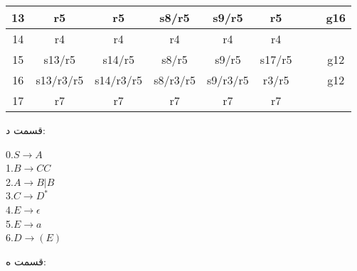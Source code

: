 \begin{center}
\begin{latin}
\begin{tabular}{|c|c|c|c|c|c|c|c|c|}
    13     &r5        &r5        &s8/r5     &s9/r5     &r5        &           &          &g16\\ \hline
    14     &r4        &r4        &r4        &r4        &r4        &           &          &   \\ \hline
    15     &s13/r5    &s14/r5    &s8/r5     &s9/r5     &s17/r5    &           &          &g12\\ \hline
    16     &s13/r3/r5 &s14/r3/r5 &s8/r3/r5  &s9/r3/r5  &r3/r5     &           &          &g12\\ \hline
    17     &r7        &r7        &r7        &r7        &r7        &           &          &   \\ \hline
    \end{tabular}
    \end{latin}
\end{center}

قسمت د:

\begin{center}
    \begin{latin}
    0.$S \rightarrow A$
    \\
    1.$B \rightarrow CC$
    \\
    2.$A \rightarrow B|B$
    \\
    3.$C \rightarrow {D}^{*}$
    \\
    4.$E \rightarrow \epsilon$
    \\
    5.$E \rightarrow a$
    \\
    6.$D \rightarrow (E)$
    \\
    \end{latin}
\end{center}

قسمت ه: